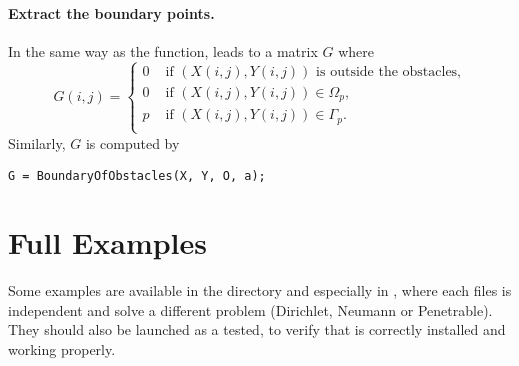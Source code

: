 \paragraph{Extract the boundary points.} In the same way as the  function,  leads to a matrix $G$ where
$$
G(i,j) = \begin{cases}
0 & \text{ if } (X(i,j),Y(i,j)) \text{ is outside the obstacles,}\\
0 & \text{ if } (X(i,j),Y(i,j)) \in\Omega_p,\\
p & \text{ if } (X(i,j),Y(i,j)) \in\Gamma_p.\\
\end{cases}
$$
Similarly, $G$ is computed by
\begin{verbatim}
G = BoundaryOfObstacles(X, Y, O, a);
\end{verbatim}

\section{Full Examples}

Some examples are available in the  directory and especially in , where each files is independent and solve a different problem (Dirichlet, Neumann or Penetrable). They should also be launched as a tested, to verify that \mudiff is correctly installed and working properly.
